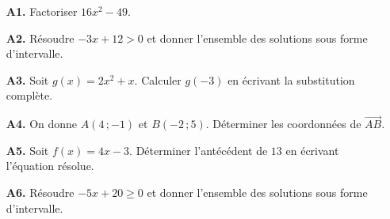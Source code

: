 \documentclass[10pt,a4paper]{article}
\begin{document}
\newpage
{}
\begin{enumerate}
\needspace{22mm}
\item[\textbf{A1.}] Factoriser $16x^2 - 49$.
\par\vspace{1.2mm}
\needspace{22mm}
\item[\textbf{A2.}] Résoudre $-3x + 12 > 0$ et donner l'ensemble des solutions sous forme d'intervalle.
\par\vspace{1.2mm}
\needspace{22mm}
\item[\textbf{A3.}] Soit $g(x) = 2x^2 + x$. Calculer $g(-3)$ en écrivant la substitution complète.
\par\vspace{1.2mm}
\needspace{22mm}
\item[\textbf{A4.}] On donne $A(4\,;-1)$ et $B(-2\,;5)$. Déterminer les coordonnées de $\vec{AB}$.
\par\vspace{1.2mm}
\needspace{22mm}
\item[\textbf{A5.}] Soit $f(x) = 4x - 3$. Déterminer l'antécédent de $13$ en écrivant l'équation résolue.
\par\vspace{1.2mm}
\needspace{22mm}
\item[\textbf{A6.}] Résoudre $-5x + 20 \ge 0$ et donner l'ensemble des solutions sous forme d'intervalle.
\par\vspace{1.2mm}
\end{enumerate}
\needspace{68mm}\par\vspace{3mm}
\end{document}
